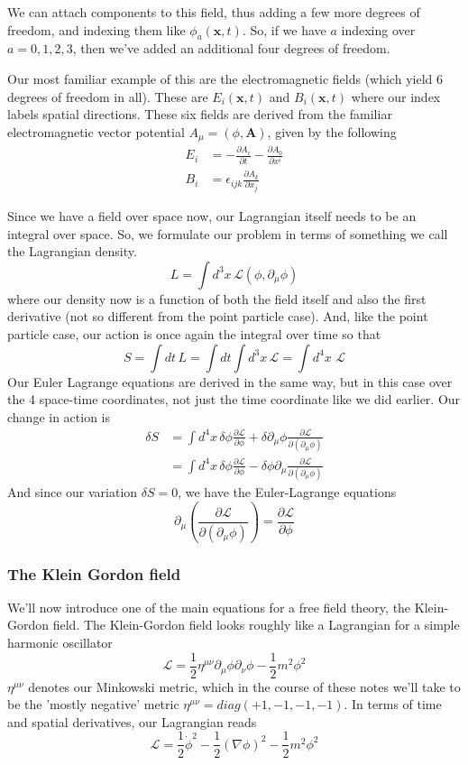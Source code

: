 \documentclass[11pt, oneside]{article}   	%
\theoremstyle{newline}
\theoremstyle{newline}
\theoremstyle{newline}
\theoremstyle{newline}
\theoremstyle{newline}
\begin{document}
We can attach components to this field, thus adding a few more degrees of freedom, and indexing them like $\phi_a ( \mathbf{x}, t)$. So, if we have $a$ indexing over $a =0, 1, 2, 3$, then we've added an additional four degrees of freedom. 

Our most familiar example of this are the electromagnetic fields (which yield 6 degrees of freedom in all). These are $E_i( \mathbf{x}, t)$ and $B_i( \mathbf{ x}, t)$ where our index labels spatial directions. These six fields are derived from the familiar electromagnetic vector potential $A_\mu  = (\phi, \mathbf{A} ) $, given by the following 
\begin{align*}
E_i &=  - \frac{ \partial A_i }{ \partial t }  - \frac{ \partial A_0 }{ \partial x^i} \\
B_i & = \epsilon_{ ijk } \frac{ \partial A_k}{ \partial x_j } 
\end{align*} 


Since we have a field over space now, our Lagrangian itself needs to be an integral over space. So, we formulate our problem in terms of something we call the Lagrangian density. \[ L = \int d^3 x \, \mathcal{L} ( \phi, \partial_\mu \phi ) \] 
where our density now is a function of both the field itself and also the first derivative (not so different from the point particle case). And, like the point particle case, our action is once again the integral over time so that \[ S = \int dt \, L  = \int dt \int d^3 x \, \mathcal{L } = \int d^4 x \, \, \mathcal{ L } \] 
Our Euler Lagrange equations are derived in the same way, but in this case over the 4 space-time coordinates, not just the time coordinate like we did earlier. Our change in action is 
\begin{align*} 
\delta S &= \int d^4 x \, \delta \phi \frac{ \partial \mathcal{ L} }{ \partial \phi } + \delta \partial_\mu \phi \frac{ \partial \mathcal{ L }}{ \partial ( \partial_\mu \phi ) } \\ 
&= \int d^4 x \, \delta \phi \frac{ \partial \mathcal{L } } { \partial \phi }   - \delta\phi  \partial_\mu \frac{\partial \mathcal{ L  }}{ \partial ( \partial_\mu \phi ) }
\end{align*} 
And since our variation $\delta S = 0$, we have the Euler-Lagrange equations 
\[ \partial_\mu  \left( \frac{ \partial \mathcal{ L } }{ \partial (\partial_\mu \phi) } \right)  = \frac{ \partial \mathcal{ L } }{ \partial \phi }  \] 

\subsubsection{The Klein Gordon field} 
We'll now introduce one of the main equations for a free field theory, the Klein-Gordon field. The Klein-Gordon field looks roughly like a Lagrangian for a simple harmonic oscillator
\[ 
\mathcal{L}  = \frac{1}{2} \eta^{ \mu \nu} \partial_\mu \phi \partial_\nu \phi  - \frac{1}{2} m^2 \phi^2 
\] 
$\eta^{\mu \nu}$ denotes our Minkowski metric, which in the course of these notes we'll take to be the 'mostly negative' metric $\eta^{\mu \nu}  = diag ( +1, -1, -1, -1)$. In terms of time and spatial derivatives, our Lagrangian reads 
\[ 
\mathcal{ L }  = \frac{1}{2} \dot{ \phi}^2  - \frac{1}{2} ( \nabla \phi)^2  - \frac{1}{ 2} m^2 \phi^2 
\]
\end{document}

